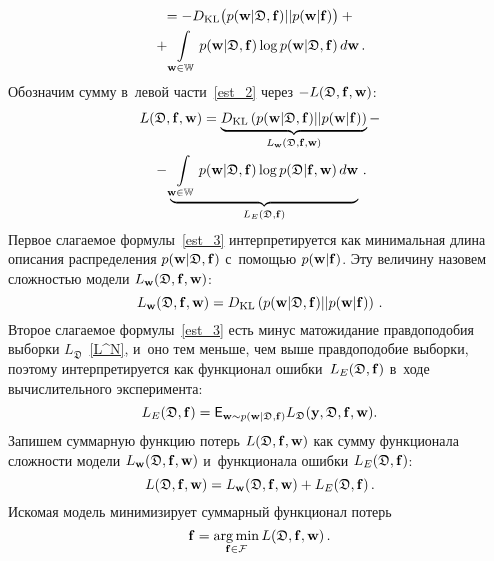 \begin{multicols}{2}
\begin{multline}
{}= -D_{\mathrm{KL}}\bigl(p(\mathbf{w}|\mathfrak{D},{\mathbf{f}})||p(\mathbf{w}|{\mathbf{f}})\bigr) + {}\\
{}+\int\limits_{\mathbf{w} \in 
\mathbb{W}}p(\mathbf{w}|\mathfrak{D},{\mathbf{f}})\log 
p(\mathbf{w}|\mathfrak{D},{\mathbf{f}})\,d\mathbf{w}\,.
\label{est_2}
\end{multline}
Обозначим сумму в~левой части~\eqref{est_2} через $-L(\mathfrak{D},{\mathbf{f}},\mathbf{w})$:
\begin{multline}
L(\mathfrak{D},{\mathbf{f}},\mathbf{w}) = 
\underbrace{D_{\mathrm{KL}}\left(p(\mathbf{w}|\mathfrak{D},{\mathbf{f}})||p(\mathbf{w}|{\mathbf{f}})\right)}_{L_\mathbf{w}(\mathfrak{D},
{\mathbf{f}},{\mathbf{w}})} - {}\\
{}-\underbrace{\int\limits_{\mathbf{w} \in 
\mathbb{W}}p(\mathbf{w}|\mathfrak{D},{\mathbf{f}})\log p(\mathfrak{D}|{\mathbf{f}},\mathbf{w})\,
d\mathbf{w}}_{L_E(\mathfrak{D},{\mathbf{f}})}\,.
\label{est_3}
\end{multline}
Первое слагаемое формулы~\eqref{est_3} интерпретируется как минимальная длина 
описания распределения $p(\mathbf{w}|\mathfrak{D},{\mathbf{f}})$ с~помощью $p(\mathbf{w}|{\mathbf{f}})$. Эту 
величину назовем сложностью модели $L_\mathbf{w}(\mathfrak{D},{\mathbf{f}},\mathbf{w})$:
\begin{equation*}
L_\mathbf{w}(\mathfrak{D},{\mathbf{f}},\mathbf{w}) = D_{\mathrm{KL}}
\left(p(\mathbf{w}|\mathfrak{D},{\mathbf{f}})||p(\mathbf{w}|{\mathbf{f}})\right)\,. 
\end{equation*}
Второе слагаемое формулы~\eqref{est_3} есть минус мат\-ожи\-да\-ние правдоподобия 
выборки $L_\mathfrak{D}$~\eqref{L^N}, и~оно тем меньше, чем выше правдоподобие выборки, 
поэтому интерпретируется как функционал ошибки~$L_E (\mathfrak{D},{\mathbf{f}})$ в~ходе 
вычислительного эксперимента:
\begin{equation*}
L_E (\mathfrak{D},{\mathbf{f}}) = 
\mathsf{E}_{\mathbf{w}\sim p(\mathbf{w}|\mathfrak{D},{\mathbf{f}})}L_\mathfrak{D}({\mathbf{y}},\mathfrak{D}, {\mathbf{f}},\mathbf{w}).
\end{equation*}
Запишем суммарную функцию потерь $L(\mathfrak{D},{\mathbf{f}},\mathbf{w})$ как сумму функционала 
сложности модели $L_\mathbf{w}(\mathfrak{D},{\mathbf{f}},\mathbf{w})$ и~функционала ошибки $L_E (\mathfrak{D},{\mathbf{f}})$:
\begin{equation}
L(\mathfrak{D},{\mathbf{f}},\mathbf{w}) = L_\mathbf{w}(\mathfrak{D},{\mathbf{f}},\mathbf{w}) + L_E (\mathfrak{D},{\mathbf{f}})\,. 
\label{loss}
\end{equation}
Искомая модель минимизирует суммарный функционал потерь
\begin{equation*}
{\mathbf{f}} = \mathop{\mathrm{arg}\,\mathrm{min}}\limits_{{\mathbf{f}} \in \mathcal{F}}L(\mathfrak{D},{\mathbf{f}},\mathbf{w})\,.
\end{equation*}


\end{multicols}
